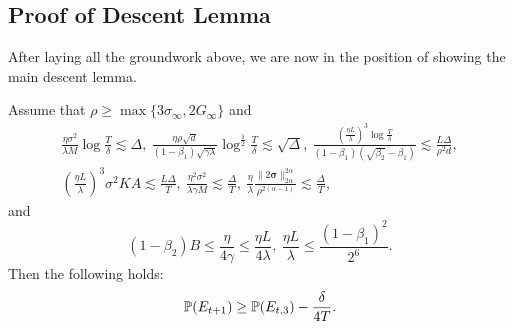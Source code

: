 \documentclass{article} %
\numberwithin{equation}{section}
\begin{document}
\subsection{Proof of Descent Lemma}

    After laying all the groundwork above, we are now in the position of showing the main descent lemma.

\begin{lemma}\label{lem:descent}
    Assume that $\rho\geq \max\{3\sigma_\infty, 2G_\infty\}$ and
    \begin{equation}\label{eq:ub_eta_descent}
        \begin{array}{c}
            \frac{\eta\sigma^2}{\lambda M}\log\frac{T}{\delta}\lesssim \Delta,\ 
            \frac{\eta\rho\sqrt{d}}{(1-\beta_1)\sqrt{\gamma\lambda}}\log^{\frac{1}{2}}\frac{T}{\delta}\lesssim\sqrt{\Delta},\
            \frac{\left(\frac{\eta L}{\lambda}\right)^3\log\frac{T}{\delta}}{(1-\beta_1)(\sqrt{\beta_2}-\beta_1)}\lesssim \frac{L\Delta}{\rho^2 d}, \\
            \left(\frac{\eta L}{\lambda}\right)^3\sigma^2KA\lesssim \frac{L\Delta}{T},\
            \frac{\eta^2\sigma^2}{\lambda\gamma M}\lesssim \frac{\Delta}{T},\ 
            \frac{\eta }{\lambda}\frac{\|2\boldsymbol{\sigma}\|_{2\alpha}^{2\alpha}}{\rho^{2(\alpha-1)}}\lesssim \frac{\Delta}{T},
        \end{array}        
    \end{equation}
    and
    \begin{equation}
        (1-\beta_2)B\leq \frac{\eta}{4\gamma}\leq \frac{\eta L}{4\lambda},\ \frac{\eta L}{\lambda}\leq \frac{(1-\beta_1)^2}{2^6}.
    \end{equation}
    Then the following holds:
    \begin{equation}
        \mathbb{P}(E_{t+1}) \geq \mathbb{P}(E_{t,3}) - \frac{\delta}{4T}.
    \end{equation}
\end{lemma}
\end{document}
